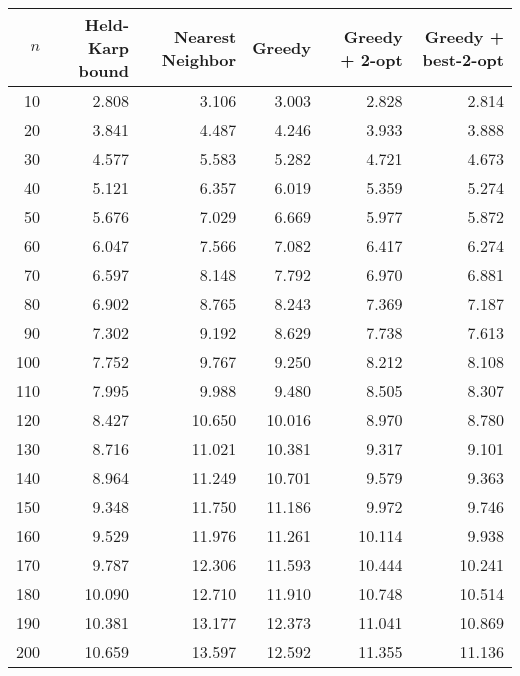 \documentclass{article}
\begin{document}
\begin{tabular}{|rrrrrr|}
\hline
$n$ & Held-Karp bound & Nearest Neighbor & Greedy & Greedy + 2-opt & Greedy + best-2-opt \\
\hline
10 & 2.808 & 3.106 & 3.003 & 2.828 & 2.814 \\
20 & 3.841 & 4.487 & 4.246 & 3.933 & 3.888 \\
30 & 4.577 & 5.583 & 5.282 & 4.721 & 4.673 \\
40 & 5.121 & 6.357 & 6.019 & 5.359 & 5.274 \\
50 & 5.676 & 7.029 & 6.669 & 5.977 & 5.872 \\
60 & 6.047 & 7.566 & 7.082 & 6.417 & 6.274 \\
70 & 6.597 & 8.148 & 7.792 & 6.970 & 6.881 \\
80 & 6.902 & 8.765 & 8.243 & 7.369 & 7.187 \\
90 & 7.302 & 9.192 & 8.629 & 7.738 & 7.613 \\
100 & 7.752 & 9.767 & 9.250 & 8.212 & 8.108 \\
110 & 7.995 & 9.988 & 9.480 & 8.505 & 8.307 \\
120 & 8.427 & 10.650 & 10.016 & 8.970 & 8.780 \\
130 & 8.716 & 11.021 & 10.381 & 9.317 & 9.101 \\
140 & 8.964 & 11.249 & 10.701 & 9.579 & 9.363 \\
150 & 9.348 & 11.750 & 11.186 & 9.972 & 9.746 \\
160 & 9.529 & 11.976 & 11.261 & 10.114 & 9.938 \\
170 & 9.787 & 12.306 & 11.593 & 10.444 & 10.241 \\
180 & 10.090 & 12.710 & 11.910 & 10.748 & 10.514 \\
190 & 10.381 & 13.177 & 12.373 & 11.041 & 10.869 \\
200 & 10.659 & 13.597 & 12.592 & 11.355 & 11.136 \\
\hline
\end{tabular}
\end{document}
